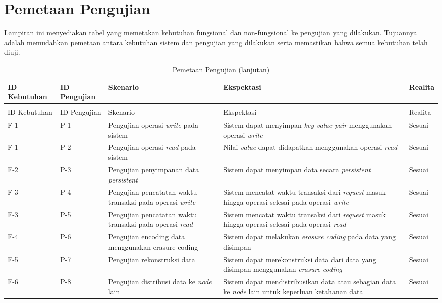 \chapter{Pemetaan Pengujian}
\label{appendix:pemetaan-pengujian}

Lampiran ini menyediakan tabel yang memetakan kebutuhan fungsional dan non-fungsional ke pengujian yang dilakukan. Tujuannya adalah memudahkan pemetaan antara kebutuhan sistem dan pengujian yang dilakukan serta memastikan bahwa semua kebutuhan telah diuji.

\begin{longtable}{|l|l|p{3cm}|p{3cm}|l|}
\caption{Pemetaan Pengujian}
\label{tab:pemetaan-pengujian} \\
\hline
\rowcolor{black!10} ID Kebutuhan & ID Pengujian & Skenario & Ekspektasi & Realita \\ \hline
\endfirsthead

\caption[]{Pemetaan Pengujian (lanjutan)} \\
\hline
\rowcolor{black!10} ID Kebutuhan & ID Pengujian & Skenario & Ekspektasi & Realita \\ \hline
\endhead

F-1 & P-1 & Pengujian operasi \textit{write} pada sistem & Sistem dapat menyimpan \textit{key-value pair} menggunakan operasi \textit{write} & Sesuai \\ \hline
F-1 & P-2 & Pengujian operasi \textit{read} pada sistem & Nilai \textit{value} dapat didapatkan menggunakan operasi \textit{read} & Sesuai \\ \hline
F-2 & P-3 & Pengujian penyimpanan data \textit{persistent} & Sistem dapat menyimpan data secara \textit{persistent} & Sesuai \\ \hline
F-3 & P-4 & Pengujian pencatatan waktu transaksi pada operasi \textit{write} & Sistem mencatat waktu transaksi dari \textit{request} masuk hingga operasi selesai pada operasi \textit{write} & Sesuai \\ \hline
F-3 & P-5 & Pengujian pencatatan waktu transaksi pada operasi \textit{read} & Sistem mencatat waktu transaksi dari \textit{request} masuk hingga operasi selesai pada operasi \textit{read} & Sesuai \\ \hline
F-4 & P-6 & Pengujian encoding data menggunakan erasure coding & Sistem dapat melakukan \textit{erasure coding} pada data yang disimpan & Sesuai \\ \hline
F-5 & P-7 & Pengujian rekonstruksi data & Sistem dapat merekonstruksi data dari data yang disimpan menggunakan \textit{erasure coding} & Sesuai \\ \hline
F-6 & P-8 & Pengujian distribusi data ke \textit{node} lain & Sistem dapat mendistribusikan data atau sebagian data ke \textit{node} lain untuk keperluan ketahanan data & Sesuai \\ \hline
\end{longtable}